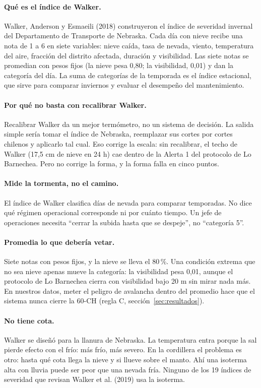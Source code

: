 \documentclass[11pt,a4paper]{article}
\begin{document}
\paragraph{Qué es el índice de Walker.} Walker, Anderson y Esmaeili (2018) construyeron el índice de severidad invernal del Departamento de Transporte de Nebraska. Cada día con nieve recibe una nota de 1 a 6 en siete variables: nieve caída, tasa de nevada, viento, temperatura del aire, fracción del distrito afectada, duración y visibilidad. Las siete notas se promedian con pesos fijos (la nieve pesa 0,80; la visibilidad, 0,01) y dan la categoría del día. La suma de categorías de la temporada es el índice estacional, que sirve para comparar inviernos y evaluar el desempeño del mantenimiento.

\paragraph{Por qué no basta con recalibrar Walker.} Recalibrar Walker da un mejor termómetro, no un sistema de decisión. La salida simple sería tomar el índice de Nebraska, reemplazar sus cortes por cortes chilenos y aplicarlo tal cual. Eso corrige la escala: sin recalibrar, el techo de Walker (17,5 cm de nieve en 24 h) cae dentro de la Alerta 1 del protocolo de Lo Barnechea. Pero no corrige la forma, y la forma falla en cinco puntos.

\paragraph{Mide la tormenta, no el camino.} El índice de Walker clasifica días de nevada para comparar temporadas. No dice qué régimen operacional corresponde ni por cuánto tiempo. Un jefe de operaciones necesita ``cerrar la subida hasta que se despeje'', no ``categoría 5''.

\paragraph{Promedia lo que debería vetar.} Siete notas con pesos fijos, y la nieve se lleva el 80\,\%. Una condición extrema que no sea nieve apenas mueve la categoría: la visibilidad pesa 0,01, aunque el protocolo de Lo Barnechea cierra con visibilidad bajo 20 m sin mirar nada más. En nuestros datos, meter el peligro de avalancha dentro del promedio hace que el sistema nunca cierre la 60-CH (regla C, sección~\ref{sec:resultados}).

\paragraph{No tiene cota.} Walker se diseñó para la llanura de Nebraska. La temperatura entra porque la sal pierde efecto con el frío: más frío, más severo. En la cordillera el problema es otro: hasta qué cota llega la nieve y si llueve sobre el manto. Ahí una isoterma alta con lluvia puede ser peor que una nevada fría. Ninguno de los 19 índices de severidad que revisan Walker et al. (2019) usa la isoterma.
\end{document}
